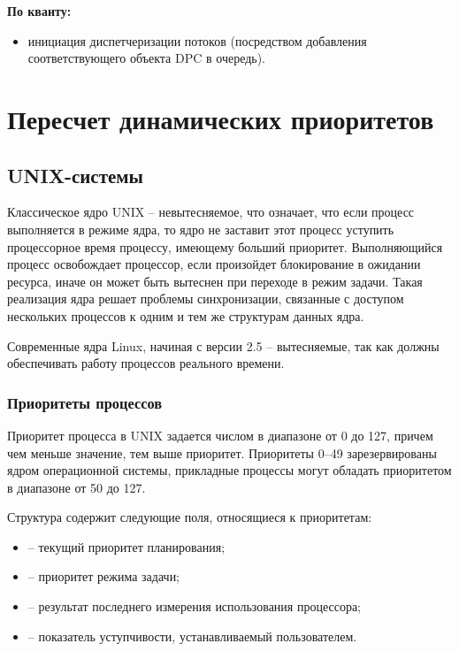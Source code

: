 \textbf{По кванту:}
\begin{itemize}
	\item инициация диспетчеризации потоков (посредством добавления соответствующего объекта {\ttfamily DPC} в очередь).
\end{itemize}

\chapter{Пересчет динамических приоритетов}

\section{UNIX-системы}

Классическое ядро UNIX -- невытесняемое, что означает, что если процесс выполняется в режиме ядра, то ядро не заставит этот процесс уступить процессорное время процессу, имеющему больший приоритет. Выполняющийся процесс освобождает процессор, если произойдет блокирование в ожидании ресурса, иначе он может быть вытеснен при переходе в режим задачи. Такая реализация ядра решает проблемы синхронизации, связанные с доступом нескольких процессов к одним и тем же структурам данных ядра.

Современные ядра Linux, начиная с версии 2.5 -- вытесняемые, так как должны обеспечивать работу процессов реального времени.

\subsection{Приоритеты процессов}

Приоритет процесса в UNIX задается числом в диапазоне от 0 до 127, причем чем меньше значение, тем выше приоритет. Приоритеты 0--49 зарезервированы ядром операционной системы, прикладные процессы могут обладать приоритетом в диапазоне от 50 до 127.

Структура  содержит следующие поля, относящиеся к приоритетам:
\begin{itemize}
	\item {} -- текущий приоритет планирования;
	\item {} -- приоритет режима задачи;
	\item {} -- результат последнего измерения использования процессора;
	\item {} -- показатель уступчивости, устанавливаемый пользователем.
\end{itemize}

